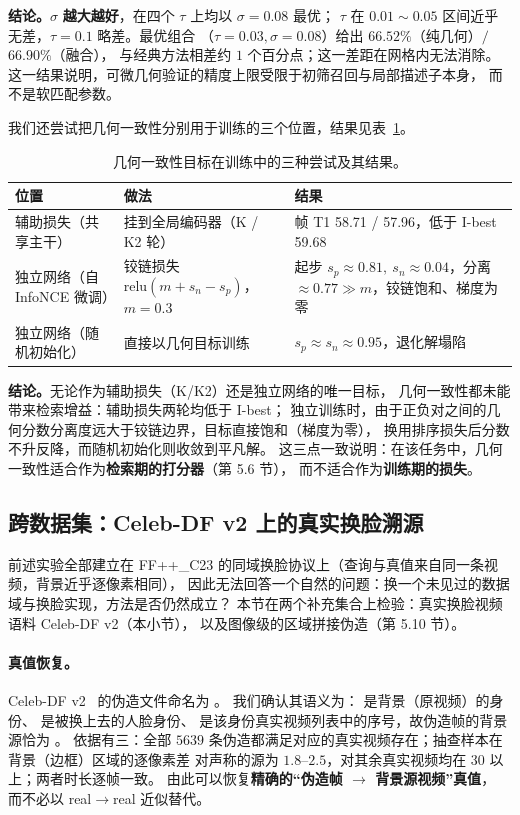 \textbf{结论。}$\sigma$ \textbf{越大越好}，在四个 $\tau$ 上均以 $\sigma=0.08$ 最优；
$\tau$ 在 $0.01\sim0.05$ 区间近乎无差，$\tau=0.1$ 略差。最优组合
（$\tau=0.03,\sigma=0.08$）给出 $66.52\%$（纯几何）$/$ $66.90\%$（融合），
与经典方法相差约 $1$ 个百分点；这一差距在网格内无法消除。
这一结果说明，可微几何验证的精度上限受限于初筛召回与局部描述子本身，
而不是软匹配参数。

我们还尝试把几何一致性分别用于训练的三个位置，结果见表~\ref{tab:geotrain}。

\begin{table}[t]
\centering
\caption{几何一致性目标在训练中的三种尝试及其结果。}
\label{tab:geotrain}
\small
\begin{tabular}{p{3.4cm}p{4.4cm}p{6.2cm}}
\toprule
位置 & 做法 & 结果 \\
\midrule
辅助损失（共享主干） & 挂到全局编码器（K / K2 轮） & 帧 T1 58.71 / 57.96，低于 I-best 59.68 \\
独立网络（自 InfoNCE 微调） & 铰链损失 $\mathrm{relu}(m+s_n-s_p)$，$m=0.3$ & 起步 $s_p\approx0.81,\ s_n\approx0.04$，分离 $\approx0.77\gg m$，铰链饱和、梯度为零 \\
独立网络（随机初始化） & 直接以几何目标训练 & $s_p\approx s_n\approx0.95$，退化解塌陷 \\
\bottomrule
\end{tabular}
\end{table}

\textbf{结论。}无论作为辅助损失（K/K2）还是独立网络的唯一目标，
几何一致性都未能带来检索增益：辅助损失两轮均低于 I-best；
独立训练时，由于正负对之间的几何分数分离度远大于铰链边界，目标直接饱和（梯度为零），
换用排序损失后分数不升反降，而随机初始化则收敛到平凡解。
这三点一致说明：在该任务中，几何一致性适合作为\textbf{检索期的打分器}（第 5.6 节），
而不适合作为\textbf{训练期的损失}。

\subsection{跨数据集：Celeb-DF v2 上的真实换脸溯源}
\label{sec:cross-exp}

前述实验全部建立在 FF++\_C23 的同域换脸协议上（查询与真值来自同一条视频，背景近乎逐像素相同），
因此无法回答一个自然的问题：换一个未见过的数据域与换脸实现，方法是否仍然成立？
本节在两个补充集合上检验：真实换脸视频语料 Celeb-DF v2（本小节），
以及图像级的区域拼接伪造（第 5.10 节）。

\paragraph{真值恢复。}Celeb-DF v2~\cite{li2020celebdf} 的伪造文件命名为 。
我们确认其语义为： 是背景（原视频）的身份、 是被换上去的人脸身份、
 是该身份真实视频列表中的序号，故伪造帧的背景源恰为 。
依据有三：全部 $5639$ 条伪造都满足对应的真实视频存在；抽查样本在背景（边框）区域的逐像素差
对声称的源为 $1.8$–$2.5$，对其余真实视频均在 $30$ 以上；两者时长逐帧一致。
由此可以恢复\textbf{精确的“伪造帧 $\rightarrow$ 背景源视频”真值}，
而不必以 real$\rightarrow$real 近似替代。

